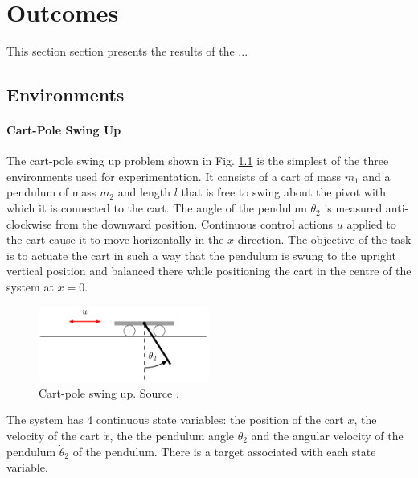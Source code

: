 \chapter{Outcomes}

\ifpdf
    \graphicspath{{Chapter3/Figs/Raster/}{Chapter3/Figs/PDF/}{Chapter3/Figs/}}
\else
    \graphicspath{{Chapter3/Figs/Vector/}{Chapter3/Figures/}}
\fi
This section section presents the results of the ...
\section{Environments}
\label{S:PILCO-environments}


\subsubsection{Cart-Pole Swing Up}
The cart-pole swing up problem shown in Fig. \ref{Fig:cartpole-environment} is the simplest of the three environments used for experimentation. It consists of a cart of mass $m_1$ and a pendulum of mass $m_2$ and length $l$ that is free to swing about the pivot with which it is connected to the cart. The angle of the pendulum $\theta_2$ is measured anti-clockwise from the downward position. Continuous control actions $u$ applied to the cart cause it to move horizontally in the $x$-direction. The objective of the task is to actuate the cart in such a way that the pendulum is swung to the upright vertical position and balanced there while positioning the cart in the centre of the system at $x=0$.
\begin{figure}[H]
\centering    
\includegraphics[width=0.5\textwidth]{Chapter3/Figures/cart-pole.png}
\caption[Cart-pole PILCO environment]{Cart-pole swing up. Source \cite{deisenroth2013pilco-documentation}.}
\label{Fig:cartpole-environment}
\end{figure}
The system has 4 continuous state variables: the position of the cart $x$, the velocity of the cart $\dot x$, the the pendulum angle $\theta_2$ and the angular velocity of the pendulum $\dot \theta_2$ of the pendulum. There is a target associated with each state variable.


